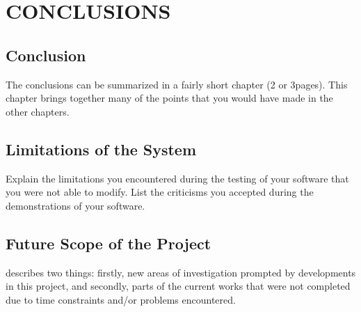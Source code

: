 
\chapter{CONCLUSIONS} %

\label{Chapter6} %



\section{Conclusion}
The conclusions can be summarized in a fairly short chapter (2 or 3pages). This chapter brings together many of the points that you would have made in the other chapters.

\section{Limitations of the System}
Explain the limitations you encountered during the testing of your software that you were not able to modify. List the criticisms you accepted during the demonstrations of your software.

\section{Future Scope of the Project}
describes two things: firstly, new areas of investigation prompted by developments in this project, and secondly, parts of the current works that were not completed due to time constraints and/or problems encountered.